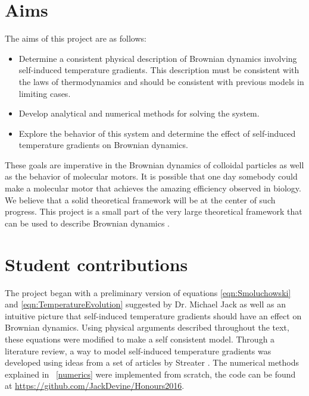 \section{Aims}
The aims of this project are as follows:
\begin{itemize}
\item{Determine a consistent physical description of Brownian dynamics involving self-induced temperature gradients. This description must be consistent with the laws of thermodynamics and should be consistent with previous models in limiting cases.}
\item{Develop analytical and numerical methods for solving the system.}
\item{Explore the behavior of this system and determine the effect of self-induced temperature gradients on Brownian dynamics.}
\end{itemize}
These goals are imperative in the Brownian dynamics of colloidal particles as well as the behavior of molecular motors. It is possible that one day somebody could make a molecular motor that achieves the amazing efficiency observed in biology. We believe that a solid theoretical framework will be at the center of such progress. This project is a small part of the very large theoretical framework that can be used to describe Brownian dynamics \cite{Astumian2007,KellerBustamante2000,leibler1990physical,Leibler1993}.
\section{Student contributions}
The project began with a preliminary version of equations \ref{eqn:Smoluchowski} and \ref{eqn:TemperatureEvolution} suggested by Dr. Michael Jack as well as an intuitive picture that self-induced temperature gradients should have an effect on Brownian dynamics. Using physical arguments described throughout the text, these equations were modified to make a self consistent model. Through a literature review, a way to model self-induced temperature gradients was developed using ideas from a set of articles by Streater \cite{Streater1997, Streater1997a,Streater2000,Streater1997b}. The numerical methods explained in ~\autoref{numerics} were implemented from scratch, the code can be found at \href{url}{https://github.com/JackDevine/Honours2016}.
